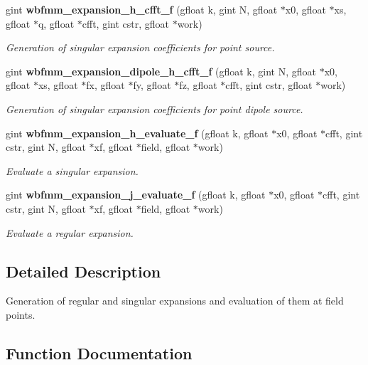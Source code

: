 \begin{DoxyCompactItemize}
gint \textbf{ wbfmm\+\_\+expansion\+\_\+h\+\_\+cfft\+\_\+f} (gfloat k, gint N, gfloat $\ast$x0, gfloat $\ast$xs, gfloat $\ast$q, gfloat $\ast$cfft, gint cstr, gfloat $\ast$work)
\begin{DoxyCompactList}\small\item\em Generation of singular expansion coefficients for point source. \end{DoxyCompactList}\item 
gint \textbf{ wbfmm\+\_\+expansion\+\_\+dipole\+\_\+h\+\_\+cfft\+\_\+f} (gfloat k, gint N, gfloat $\ast$x0, gfloat $\ast$xs, gfloat $\ast$fx, gfloat $\ast$fy, gfloat $\ast$fz, gfloat $\ast$cfft, gint cstr, gfloat $\ast$work)
\begin{DoxyCompactList}\small\item\em Generation of singular expansion coefficients for point dipole source. \end{DoxyCompactList}\item 
gint \textbf{ wbfmm\+\_\+expansion\+\_\+h\+\_\+evaluate\+\_\+f} (gfloat k, gfloat $\ast$x0, gfloat $\ast$cfft, gint cstr, gint N, gfloat $\ast$xf, gfloat $\ast$field, gfloat $\ast$work)
\begin{DoxyCompactList}\small\item\em Evaluate a singular expansion. \end{DoxyCompactList}\item 
gint \textbf{ wbfmm\+\_\+expansion\+\_\+j\+\_\+evaluate\+\_\+f} (gfloat k, gfloat $\ast$x0, gfloat $\ast$cfft, gint cstr, gint N, gfloat $\ast$xf, gfloat $\ast$field, gfloat $\ast$work)
\begin{DoxyCompactList}\small\item\em Evaluate a regular expansion. \end{DoxyCompactList}\end{DoxyCompactItemize}


\subsection{Detailed Description}
Generation of regular and singular expansions and evaluation of them at field points. 



\subsection{Function Documentation}
\mbox{\label{group__expansions_gae0eb6687e4c41ba695e45143e40d9edb}} 
